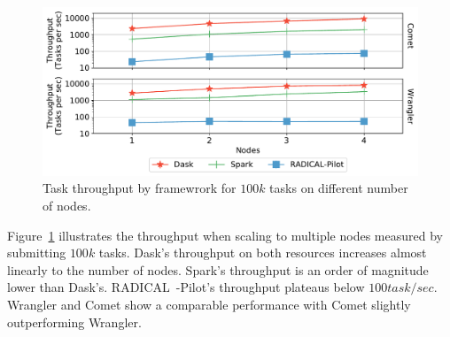 \begin{figure}[t]
    \centering
    \includegraphics[width=.85\textwidth]{figures/data_analytics_hpc/task_par/daskVSsparkVSRpThroughput.pdf}
    \caption{Task throughput by framewrork for $100k$ tasks on different number of nodes.}
    \label{fig:RP_Dask_Spark_throughput}
\end{figure}

Figure~\ref{fig:RP_Dask_Spark_throughput} illustrates the throughput when scaling to multiple nodes measured by submitting $100k$ tasks.
Dask's throughput on both resources increases almost linearly to the number of nodes.
Spark's throughput is an order of magnitude lower than Dask's.
RADICAL~-Pilot's throughput plateaus below $100 task/sec$.
Wrangler and Comet show a comparable performance with Comet slightly outperforming Wrangler.



